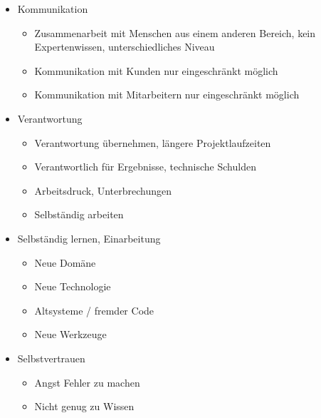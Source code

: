 \begin{itemize}
\item Kommunikation
\begin{itemize}
  \item Zusammenarbeit mit Menschen aus einem anderen Bereich, kein Expertenwissen, unterschiedliches Niveau
  \item Kommunikation mit Kunden nur eingeschränkt möglich
  \item Kommunikation mit Mitarbeitern nur eingeschränkt möglich
\end{itemize}
\item Verantwortung
\begin{itemize}
  \item Verantwortung übernehmen, längere Projektlaufzeiten
  \item Verantwortlich für Ergebnisse, technische Schulden
  \item Arbeitsdruck, Unterbrechungen
  \item Selbständig arbeiten
\end{itemize}
\item Selbständig lernen, Einarbeitung
\begin{itemize}
  \item Neue Domäne
  \item Neue Technologie
  \item Altsysteme / fremder Code
  \item Neue Werkzeuge
\end{itemize}
\item Selbstvertrauen
\begin{itemize}
  \item Angst Fehler zu machen
  \item Nicht genug zu Wissen
\end{itemize}
\end{itemize}



